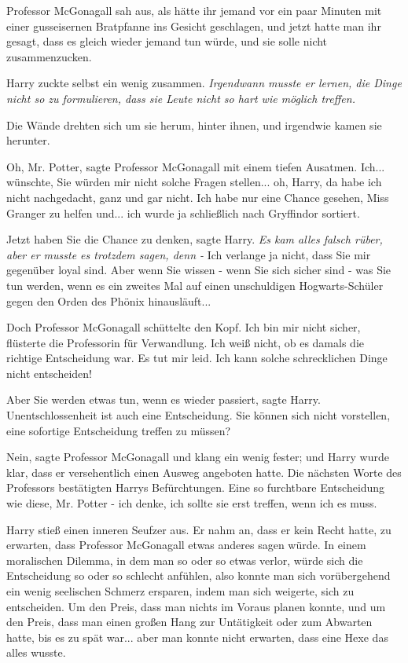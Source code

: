 Professor McGonagall sah aus, als hätte ihr jemand vor ein paar Minuten mit
einer gusseisernen Bratpfanne ins Gesicht geschlagen, und jetzt hatte man ihr
gesagt, dass es gleich wieder jemand tun würde, und sie solle nicht
zusammenzucken.

Harry zuckte selbst ein wenig zusammen. \emph{Irgendwann musste er lernen, die
Dinge nicht so zu formulieren, dass sie Leute nicht so hart wie möglich
treffen.}

Die Wände drehten sich um sie herum, hinter ihnen, und irgendwie kamen sie
herunter.

\glqq{}Oh, Mr. Potter\grqq{}, sagte Professor McGonagall mit einem tiefen
Ausatmen. \glqq{}Ich... wünschte, Sie würden mir nicht solche Fragen stellen...
oh, Harry, da habe ich nicht nachgedacht, ganz und gar nicht. Ich habe nur eine
Chance gesehen, Miss Granger zu helfen und... ich wurde ja schließlich nach
Gryffindor sortiert.\grqq{}

\glqq{}Jetzt haben Sie die Chance zu denken\grqq{}, sagte Harry. \emph{Es kam
alles falsch rüber, aber er musste es trotzdem sagen, denn -} \glqq{}Ich verlange
ja nicht, dass Sie mir gegenüber loyal sind. Aber wenn Sie wissen - wenn Sie
sich sicher sind - was Sie tun werden, wenn es ein zweites Mal auf einen
unschuldigen Hogwarts-Schüler gegen den Orden des Phönix hinausläuft...\grqq{}

Doch Professor McGonagall schüttelte den Kopf. \glqq{}Ich bin mir nicht
sicher\grqq{}, flüsterte die Professorin für Verwandlung. \glqq{}Ich weiß nicht,
ob es damals die richtige Entscheidung war. Es tut mir leid. Ich kann solche
schrecklichen Dinge nicht entscheiden!\grqq{}

\glqq{}Aber Sie werden etwas tun, wenn es wieder passiert\grqq{}, sagte Harry.
\glqq{}Unentschlossenheit ist auch eine Entscheidung. Sie können sich nicht
vorstellen, eine sofortige Entscheidung treffen zu müssen?\grqq{}

\glqq{}Nein\grqq{}, sagte Professor McGonagall und klang ein wenig fester; und
Harry wurde klar, dass er versehentlich einen Ausweg angeboten hatte. Die
nächsten Worte des Professors bestätigten Harrys Befürchtungen. \glqq{}Eine so
furchtbare Entscheidung wie diese, Mr. Potter - ich denke, ich sollte sie erst
treffen, wenn ich es muss.\grqq{}

Harry stieß einen inneren Seufzer aus. Er nahm an, dass er kein Recht hatte, zu
erwarten, dass Professor McGonagall etwas anderes sagen würde. In einem
moralischen Dilemma, in dem man so oder so etwas verlor, würde sich die
Entscheidung so oder so schlecht anfühlen, also konnte man sich vorübergehend
ein wenig seelischen Schmerz ersparen, indem man sich weigerte, sich zu
entscheiden. Um den Preis, dass man nichts im Voraus planen konnte, und um den
Preis, dass man einen großen Hang zur Untätigkeit oder zum Abwarten hatte, bis
es zu spät war... aber man konnte nicht erwarten, dass eine Hexe das alles
wusste.


